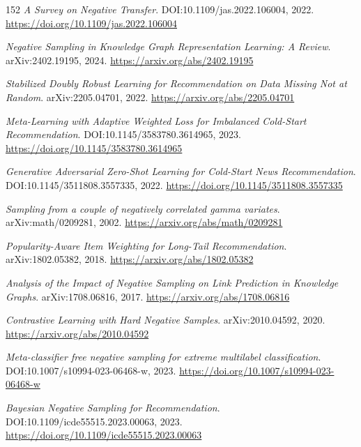 \documentclass[11pt,a4paper]{article}
\begin{document}
\begin{thebibliography}{152}
\newblock \emph{A Survey on Negative Transfer}.
\newblock DOI:10.1109/jas.2022.106004, 2022.
\newblock \url{https://doi.org/10.1109/jas.2022.106004}

\newblock \emph{Negative Sampling in Knowledge Graph Representation Learning: A Review}.
\newblock arXiv:2402.19195, 2024.
\newblock \url{https://arxiv.org/abs/2402.19195}

\newblock \emph{Stabilized Doubly Robust Learning for Recommendation on Data Missing Not at Random}.
\newblock arXiv:2205.04701, 2022.
\newblock \url{https://arxiv.org/abs/2205.04701}

\newblock \emph{Meta-Learning with Adaptive Weighted Loss for Imbalanced Cold-Start Recommendation}.
\newblock DOI:10.1145/3583780.3614965, 2023.
\newblock \url{https://doi.org/10.1145/3583780.3614965}

\newblock \emph{Generative Adversarial Zero-Shot Learning for Cold-Start News Recommendation}.
\newblock DOI:10.1145/3511808.3557335, 2022.
\newblock \url{https://doi.org/10.1145/3511808.3557335}

\newblock \emph{Sampling from a couple of negatively correlated gamma variates}.
\newblock arXiv:math/0209281, 2002.
\newblock \url{https://arxiv.org/abs/math/0209281}

\newblock \emph{Popularity-Aware Item Weighting for Long-Tail Recommendation}.
\newblock arXiv:1802.05382, 2018.
\newblock \url{https://arxiv.org/abs/1802.05382}

\newblock \emph{Analysis of the Impact of Negative Sampling on Link Prediction in Knowledge Graphs}.
\newblock arXiv:1708.06816, 2017.
\newblock \url{https://arxiv.org/abs/1708.06816}

\newblock \emph{Contrastive Learning with Hard Negative Samples}.
\newblock arXiv:2010.04592, 2020.
\newblock \url{https://arxiv.org/abs/2010.04592}

\newblock \emph{Meta-classifier free negative sampling for extreme multilabel classification}.
\newblock DOI:10.1007/s10994-023-06468-w, 2023.
\newblock \url{https://doi.org/10.1007/s10994-023-06468-w}

\newblock \emph{Bayesian Negative Sampling for Recommendation}.
\newblock DOI:10.1109/icde55515.2023.00063, 2023.
\newblock \url{https://doi.org/10.1109/icde55515.2023.00063}


\end{thebibliography}
\end{document}
